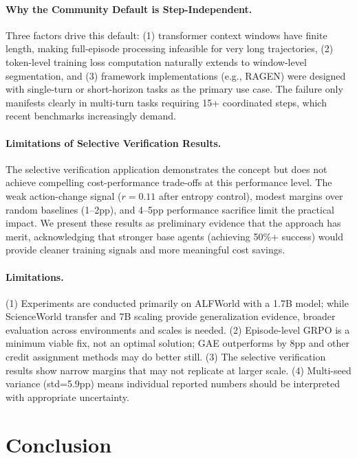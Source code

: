 \documentclass[11pt]{article}
\begin{document}
\paragraph{Why the Community Default is Step-Independent.}
Three factors drive this default: (1) transformer context windows have finite length, making full-episode processing infeasible for very long trajectories, (2) token-level training loss computation naturally extends to window-level segmentation, and (3) framework implementations (e.g., RAGEN) were designed with single-turn or short-horizon tasks as the primary use case. The failure only manifests clearly in multi-turn tasks requiring 15+ coordinated steps, which recent benchmarks increasingly demand.

\paragraph{Limitations of Selective Verification Results.}
The selective verification application demonstrates the concept but does not achieve compelling cost-performance trade-offs at this performance level. The weak action-change signal ($r=0.11$ after entropy control), modest margins over random baselines (1--2pp), and 4--5pp performance sacrifice limit the practical impact. We present these results as preliminary evidence that the approach has merit, acknowledging that stronger base agents (achieving 50\%+ success) would provide cleaner training signals and more meaningful cost savings.

\paragraph{Limitations.}
(1) Experiments are conducted primarily on ALFWorld with a 1.7B model; while ScienceWorld transfer and 7B scaling provide generalization evidence, broader evaluation across environments and scales is needed. (2) Episode-level GRPO is a minimum viable fix, not an optimal solution; GAE outperforms by 8pp and other credit assignment methods may do better still. (3) The selective verification results show narrow margins that may not replicate at larger scale. (4) Multi-seed variance (std=5.9pp) means individual reported numbers should be interpreted with appropriate uncertainty.

\section{Conclusion}
\end{document}
